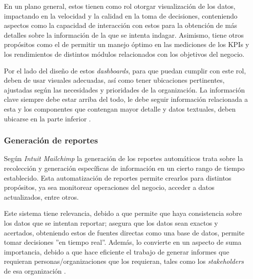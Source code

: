 \documentclass[spanish]{ieee_upb}
\begin{document}
\vspace{0.3cm}
En un plano general, estos tienen como rol otorgar visualización de los datos, impactando en la velocidad y la calidad en la toma de decisiones, conteniendo aspectos como la capacidad de interacción con estos para la obtención de más detalles sobre la información de la que se intenta indagar. Asimismo, tiene otros propósitos como el de permitir un manejo óptimo en las mediciones de los KPIs y los rendimientos de distintos módulos relacionados con los objetivos del negocio.

\vspace{0.3cm}
Por el lado del diseño de estos \textit{dashboards}, para que puedan cumplir con este rol, deben de usar visuales adecuadas, así como tener ubicaciones pertinentes, ajustadas según las necesidades y prioridades de la organización. La información clave siempre debe estar arriba del todo, le debe seguir información relacionada a esta y los componentes que contengan mayor detalle y datos textuales, deben ubicarse en la parte inferior \cite{zingde2020role}.

\vspace{0.3cm}
\subsubsection{Generación de reportes}
Según \textit{Intuit Mailchimp} \cite{mailchimp_report} la generación de los reportes automáticos trata sobre la recolección y generación específicas de información en un cierto rango de tiempo establecido. Esta automatización de reportes permite crearlos para distintos propósitos, ya sea monitorear operaciones del negocio, acceder a datos actualizados, entre otros.

\vspace{0.3cm}
Este sistema tiene relevancia, debido a que permite que haya consistencia sobre los datos que se intentan reportar; asegura que los datos sean exactos y acertados, obteniendo estos de fuentes directas como una base de datos, permite tomar decisiones ''en tiempo real''. Además, lo convierte en un aspecto de suma importancia, debido a que hace eficiente el trabajo de generar informes que requieran personas/organizaciones que los requieran, tales como los \textit{stakeholders} de esa organización \cite{mailchimp_report}.
\end{document}

